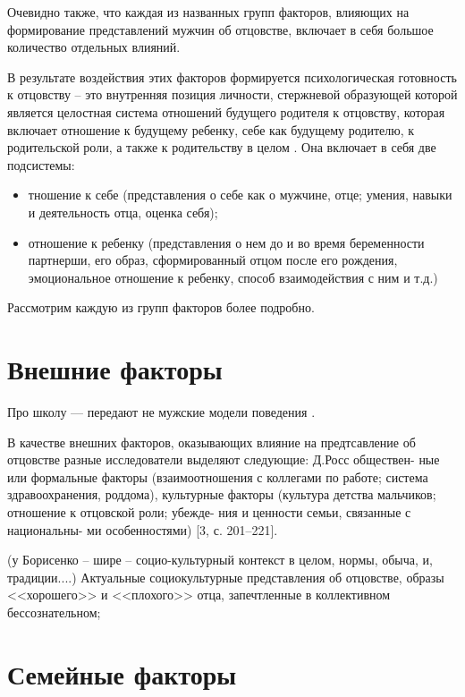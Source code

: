 \documentclass{../../common/thesisbyxetex}
\begin{document}
Очевидно также, что каждая из названных групп факторов, влияющих на формирование представлений
мужчин об отцовстве, включает в себя большое количество отдельных влияний.

В результате воздействия этих факторов формируется психологическая готовность к отцовству – это
внутренняя позиция личности,
стержневой образующей которой является целостная система отношений будущего
родителя к отцовству, которая включает отношение к будущему ребенку, себе как
будущему родителю, к родительской роли, а также к родительству в целом \cite[121]{har}. Она
включает в себя  две подсистемы:

\begin{itemize}
\item тношение к себе (представления о себе как
о мужчине, отце; умения, навыки и деятельность
отца, оценка себя);

\item отношение к ребенку (представления о нем до и во время беременности партнерши, его образ,
сформированный отцом после его рождения, эмоциональное отношение к ребенку, способ взаимодействия с
ним и т.д.)\cite[40]{otage}
\end{itemize}

Рассмотрим каждую из групп факторов более подробно.

\section{Внешние факторы}

Про школу --- передают не мужские модели поведения \cite{md}.

В качестве внешних факторов, оказывающих влияние на предтсавление об отцовстве разные исследователи
выделяют следующие:
Д.Росс обществен-
ные или формальные факторы (взаимоотношения
с коллегами по работе; система здравоохранения,
роддома), культурные факторы (культура детства
мальчиков; отношение к отцовской роли; убежде-
ния и ценности семьи, связанные с национальны-
ми особенностями) [3, с. 201–221].\cite[40]{otage}

(у Борисенко – шире – социо-культурный контекст в целом, нормы,
обыча, и, традиции....)\cite{psyot}
Актуальные социокультурные представления об отцовстве, образы <<хорошего>> и <<плохого>>
отца, запечтленные в коллективном бессознательном;

\section{Семейные факторы}
\end{document}
